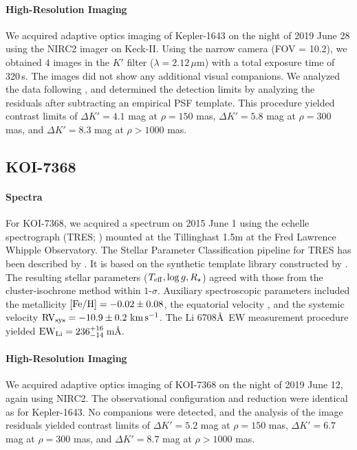 \documentclass[12pt,twocolumn,tighten,linenumbers]{aastex63}
\newcommand{\mkms}{{\rm \,km\,s^{-1}}}  %
\begin{document}
\paragraph{High-Resolution Imaging}
We acquired adaptive optics imaging of Kepler-1643 on the night of
2019 June 28 using the NIRC2 imager on Keck-II.  Using the narrow
camera (FOV = 10.2\arcsec), we obtained 4 images in the $K'$ filter
($\lambda = 2.12\,\mu$m) with a total exposure time of 320\,s. 
The images did not show any additional visual companions.
We analyzed the data following \citet{kraus_impact_2016}, and
determined the detection limits by analyzing the residuals after
subtracting an empirical PSF template.  This procedure yielded
contrast limits of $\Delta K' = 4.1$ mag at $\rho = 150$ mas, $\Delta
K' = 5.8$ mag at $\rho = 300$ mas, and $\Delta K' = 8.3$ mag
at $\rho > 1000$ mas.


\subsection{KOI-7368}
\paragraph{Spectra}
For KOI-7368, we acquired a spectrum on 2015 June 1 using the echelle
spectrograph (TRES; \citealt{furesz_tres_2008}) mounted at the
Tillinghast 1.5m at the Fred Lawrence Whipple Observatory.  The
Stellar Parameter Classification pipeline for TRES has been described
by \citet{2021tsc2.confE.124B}.  It is based on the synthetic template
library constructed by \citet{Buchhave2012}.  The resulting stellar
parameters ($T_{\rm eff}, \log g, R_\star$) agreed with those from the
cluster-isochrone method within $1$-$\sigma$.  Auxiliary
spectroscopic parameters included the metallicity $[{\rm Fe/H}]= -0.02
\pm 0.08$, the equatorial velocity \replaced{$v\sin i = 20.21 \pm 0.50\,\mkms$}{$v\sin i = 20.2 \pm 1.0\,\mkms$},
and the systemic velocity ${\rm RV}_{\rm sys} = -10.9 \pm 0.2\,\mkms$.
The Li 6708\AA\ EW measurement procedure yielded ${\rm EW}_{\rm Li} =
236^{+16}_{-14}$\,m\AA.

\paragraph{High-Resolution Imaging}
We acquired adaptive optics imaging of KOI-7368 on the night of 2019
June 12, again using NIRC2.  The observational configuration and
reduction were identical as for Kepler-1643.  No companions were
detected, and the analysis of the image residuals yielded contrast
limits of $\Delta K' = 5.2$ mag at $\rho = 150$ mas, $\Delta K' = 6.7$
mag at $\rho = 300$ mas, and $\Delta K' = 8.7$ mag at $\rho > 1000$
mas.
\end{document}
